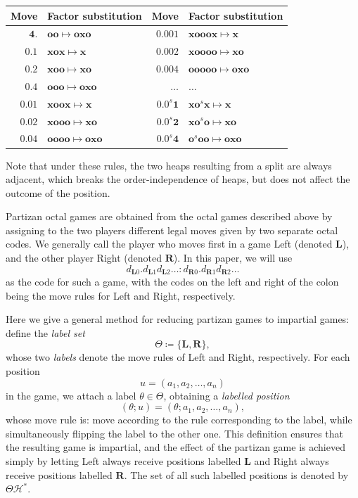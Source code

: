\documentclass[11pt]{article}
\theoremstyle{definition}
\theoremstyle{plain}
\newcommand{\rmL}{\mathbf{L}}
\newcommand{\rmR}{\mathbf{R}}
\newcommand{\x}{\mathbf{x}}
\newcommand{\e}{\mathbf{o}}
\newcommand{\varH}{\mathcal{H}}
\begin{document}
\begin{center}
    \small
    \begin{tabular}{|rl|rl|}
        \hline
        Move & Factor substitution & Move & Factor substitution \\
        \hline
        $\mathbf{4.}$ & $\e\e\mapsto \e\x\e$       & $\mathbf{0.001}$ & $\x\e\e\e\x\mapsto \x$               \\
        $\mathbf{0.1}$ & $\x\e\x\mapsto \x$        & $\mathbf{0.002}$ & $\x\e\e\e\e\mapsto \x\e$             \\
        $\mathbf{0.2}$ & $\x\e\e\mapsto \x\e$      & $\mathbf{0.004}$ & $\e\e\e\e\e\mapsto \e\x\e$           \\
        $\mathbf{0.4}$ & $\e\e\e\mapsto \e\x\e$    & $\ldots$ & $\ldots$                                     \\
        $\mathbf{0.01}$ & $\x\e\e\x\mapsto \x$     & $\mathbf{0.0}^s\mathbf{1}$ & $\x\e^{s}\x\mapsto \x$     \\
        $\mathbf{0.02}$ & $\x\e\e\e\mapsto \x\e$   & $\mathbf{0.0}^s\mathbf{2}$ & $\x\e^{s}\e\mapsto \x\e$   \\
        $\mathbf{0.04}$ & $\e\e\e\e\mapsto \e\x\e$ & $\mathbf{0.0}^s\mathbf{4}$ & $\e^{s}\e\e\mapsto \e\x\e$ \\
        \hline
    \end{tabular}
    \normalsize
\end{center}

Note that under these rules, the two heaps resulting from a split are always adjacent, which breaks the order-independence of heaps, but does not affect the outcome of the position.

Partizan octal games are obtained from the octal games described above by assigning to the two players different legal moves given by two separate octal codes.
We generally call the player who moves first in a game Left (denoted $\rmL$), and the other player Right (denoted $\rmR$).
In this paper, we will use
\[
    d_{\rmL0}.d_{\rmL1} d_{\rmL2} \ldots : d_{\rmR0}.d_{\rmR1} d_{\rmR2} \ldots
\]
as the code for such a game, with the codes on the left and right of the colon being the move rules for Left and Right, respectively.

Here we give a general method for reducing partizan games to impartial games: define the \textit{label set}
\[
    \varTheta \coloneq \{\rmL, \rmR\},
\]
whose two \textit{labels} denote the move rules of Left and Right, respectively.
For each position
\[
    u = (a_1, a_2, \ldots, a_n)
\]
in the game, we attach a label $\theta \in \varTheta$, obtaining a \textit{labelled position}
\[
    (\theta; u) = (\theta; a_1, a_2, \ldots, a_n),
\]
whose move rule is: move according to the rule corresponding to the label, while simultaneously flipping the label to the other one.
This definition ensures that the resulting game is impartial, and the effect of the partizan game is achieved simply by letting Left always receive positions labelled $\rmL$ and Right always receive positions labelled $\rmR$.
The set of all such labelled positions is denoted by $\varTheta \varH^*$.
\end{document}
